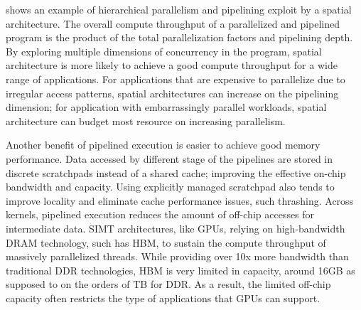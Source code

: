  shows an example of hierarchical parallelism and pipelining exploit by
a spatial architecture.
The overall compute throughput of a parallelized and pipelined program is 
the product of the total parallelization factors and pipelining depth.
By exploring multiple dimensions of concurrency in the program, spatial architecture is more likely
to achieve a good compute throughput for a wide range of applications.
For applications that are expensive to parallelize due to irregular access patterns, spatial
architectures can increase on the pipelining dimension;
for application with embarrassingly parallel workloads, spatial architecture can budget most
resource on increasing parallelism.

Another benefit of pipelined execution is easier to achieve good memory performance.
Data accessed by different stage of the pipelines are stored in discrete scratchpads 
instead of a shared cache; improving the effective on-chip bandwidth and capacity.
Using explicitly managed scratchpad also tends to improve locality and 
eliminate cache performance issues, such thrashing.
Across kernels, pipelined execution reduces the amount of off-chip accesses for intermediate
data.
SIMT architectures, like GPUs, relying on high-bandwidth DRAM technology, such has HBM, to sustain
the compute throughput of massively parallelized threads.
While providing over 10x more bandwidth than traditional DDR technologies, HBM is very limited in
capacity, around 16GB as supposed to on the orders of TB for DDR.
As a result, the limited off-chip capacity often restricts the type of applications that
GPUs can support.


